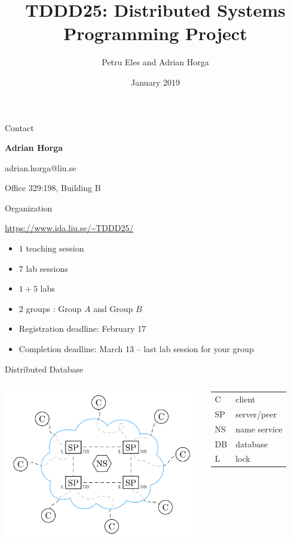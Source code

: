 \documentclass[compress,xcolor=table]{beamer}
\title{%
  TDDD25: Distributed Systems\\%
  \vspace{0.1em}%
  Programming Project%
}
\author{Petru Eles and Adrian Horga}
\date{January 2019}
\institute[Link\"oping University]{
  Computer and Information Science\\
  Link\"oping University
}
\begin{document}
\frame[plain]{\titlepage}

\begin{frame}{Contact}
\begin{center}
  \textbf{Adrian Horga}

  adrian.horga@liu.se

  Office 329:198, Building B

\end{center}
\end{frame}

\begin{frame}{Organization}
  \begin{center}
    \url{https://www.ida.liu.se/~TDDD25/}
  \end{center}
  \begin{itemize}
    \item $1$ teaching session
    \item $7$ lab sessions
    \item $1 + 5$ labs
    \item $2$ groups : Group $A$ and Group $B$
    \item Registration deadline: February 17
    \item Completion deadline: March 13 -- last lab session for your group
  \end{itemize}
\end{frame}

\begin{frame}{Distributed Database}
\begin{columns}
  \column{7cm}
  \centering
  \includegraphics[scale=0.14,page=1]{include/assets/distributed-database}
  \column{3cm}
  \begin{tabular}{l @{ --- } l}
    \alert{C}  & client \\
    \alert{SP} & server/peer \\
    \alert{NS} & name service \\
    \alert{DB} & database \\
    \alert{L}  & lock
  \end{tabular}
\end{columns}
\end{frame}
\end{document}
